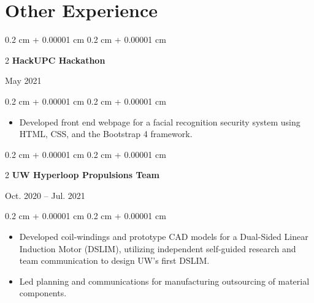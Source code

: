 \documentclass[10pt, letterpaper]{article}
\newenvironment{highlightsforbulletentries}{
    \begin{itemize}[
        topsep=0.10 cm,
        parsep=0.10 cm,
        partopsep=0pt,
        itemsep=0pt,
        leftmargin=10pt
    ]
}{
    \end{itemize}
} %
\newenvironment{onecolentry}{
    \begin{adjustwidth}{
        0.2 cm + 0.00001 cm
    }{
        0.2 cm + 0.00001 cm
    }
}{
    \end{adjustwidth}
} %
\newenvironment{twocolentry}[2][]{
    \onecolentry
    \def\secondColumn{#2}
    \setcolumnwidth{\fill, 4.5 cm}
    \begin{paracol}{2}
}{
    \switchcolumn \raggedleft \secondColumn
    \end{paracol}
    \endonecolentry
} %
\begin{document}
    \section{Other Experience}
        \begin{twocolentry}{
            May 2021
        }{
            \textbf{HackUPC Hackathon}
        }
        \end{twocolentry}
        \vspace{0.1 cm}
        \begin{onecolentry}
            \begin{highlightsforbulletentries}
                \item Developed front end webpage for a facial recognition security system using HTML, CSS, and the
                Bootstrap 4 framework.
            \end{highlightsforbulletentries}
        \end{onecolentry}

        \vspace{0.2 cm}

        \begin{twocolentry}{
            Oct. 2020 – Jul. 2021
        }{
            \textbf{UW Hyperloop Propulsions Team}
        }
        \end{twocolentry}
        \vspace{0.1 cm}
        \begin{onecolentry}
            \begin{highlightsforbulletentries}
                \item Developed coil-windings and prototype CAD models for a Dual-Sided Linear Induction Motor (DSLIM),
                utilizing independent self-guided research and team communication to design UW’s first DSLIM.
                \item Led planning and communications for manufacturing outsourcing of material components.
            \end{highlightsforbulletentries}
        \end{onecolentry}

        \vspace{0.2 cm}
\end{document}
